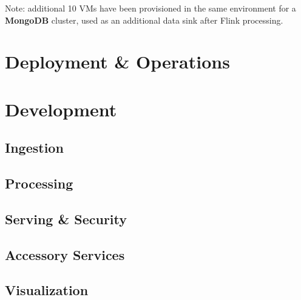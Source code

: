 Note: additional 10 VMs have been provisioned in the same environment for a \textbf{MongoDB} cluster, used as an additional data sink after Flink processing.

\section{Deployment \& Operations}

\section{Development}

\subsection{Ingestion}

\subsection{Processing}

\subsection{Serving \& Security}

\subsection{Accessory Services}

\subsection{Visualization}